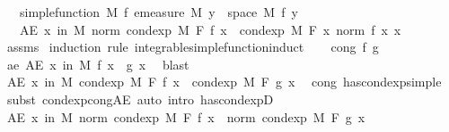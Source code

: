 \begin{isabellebody}
\ \ \ {\isachardoublequoteopen}simple{\isacharunderscore}{\kern0pt}function\ M\ f{\isachardoublequoteclose}\ {\isachardoublequoteopen}emeasure\ M\ {\isacharbraceleft}{\kern0pt}y\ {\isasymin}\ space\ M{\isachardot}{\kern0pt}\ f\ y\ {\isasymnoteq}\ {}{\isacharbraceright}{\kern0pt}\ {\isasymnoteq}\ {\isasyminfinity}{\isachardoublequoteclose}\isanewline
\ \ \ {\isachardoublequoteopen}AE\ x\ in\ M{\isachardot}{\kern0pt}\ norm\ {\isacharparenleft}{\kern0pt}cond{\isacharunderscore}{\kern0pt}exp\ M\ F\ f\ x{\isacharparenright}{\kern0pt}\ {\isasymle}\ cond{\isacharunderscore}{\kern0pt}exp\ M\ F\ {\isacharparenleft}{\kern0pt}{\isasymlambda}x{\isachardot}{\kern0pt}\ norm\ {\isacharparenleft}{\kern0pt}f\ x{\isacharparenright}{\kern0pt}{\isacharparenright}{\kern0pt}\ x{\isachardoublequoteclose}\isanewline
%
\isadelimproof
\ \ %
\endisadelimproof
%
\isatagproof
{}\isamarkupfalse%
\ assms\isanewline
{}\isamarkupfalse%
\ {\isacharparenleft}{\kern0pt}induction\ rule{\isacharcolon}{\kern0pt}\ integrable{\isacharunderscore}{\kern0pt}simple{\isacharunderscore}{\kern0pt}function{\isacharunderscore}{\kern0pt}induct{\isacharparenright}{\kern0pt}\isanewline
\ \ \isamarkupfalse%
\ {\isacharparenleft}{\kern0pt}cong\ f\ g{\isacharparenright}{\kern0pt}\isanewline
\ \ \isamarkupfalse%
\ ae{\isacharcolon}{\kern0pt}\ {\isachardoublequoteopen}AE\ x\ in\ M{\isachardot}{\kern0pt}\ f\ x\ {\isacharequal}{\kern0pt}\ g\ x{\isachardoublequoteclose}\ \isamarkupfalse%
\ blast\isanewline
\ \ \isamarkupfalse%
\ {\isachardoublequoteopen}AE\ x\ in\ M{\isachardot}{\kern0pt}\ cond{\isacharunderscore}{\kern0pt}exp\ M\ F\ f\ x\ {\isacharequal}{\kern0pt}\ cond{\isacharunderscore}{\kern0pt}exp\ M\ F\ g\ x{\isachardoublequoteclose}\ \isamarkupfalse%
\ cong\ has{\isacharunderscore}{\kern0pt}cond{\isacharunderscore}{\kern0pt}exp{\isacharunderscore}{\kern0pt}simple\ \isamarkupfalse%
\ {\isacharparenleft}{\kern0pt}subst\ cond{\isacharunderscore}{\kern0pt}exp{\isacharunderscore}{\kern0pt}cong{\isacharunderscore}{\kern0pt}AE{\isacharparenright}{\kern0pt}\ {\isacharparenleft}{\kern0pt}auto\ intro{\isacharbang}{\kern0pt}{\isacharcolon}{\kern0pt}\ has{\isacharunderscore}{\kern0pt}cond{\isacharunderscore}{\kern0pt}expD{\isacharparenleft}{\kern0pt}{}{\isacharparenright}{\kern0pt}{\isacharparenright}{\kern0pt}\isanewline
\ \ \isamarkupfalse%
\ {\isachardoublequoteopen}AE\ x\ in\ M{\isachardot}{\kern0pt}\ norm\ {\isacharparenleft}{\kern0pt}cond{\isacharunderscore}{\kern0pt}exp\ M\ F\ f\ x{\isacharparenright}{\kern0pt}\ {\isacharequal}{\kern0pt}\ norm\ {\isacharparenleft}{\kern0pt}cond{\isacharunderscore}{\kern0pt}exp\ M\ F\ g\ x{\isacharparenright}{\kern0pt}{\isachardoublequoteclose}\ \isamarkupfalse%

\end{isabellebody}
